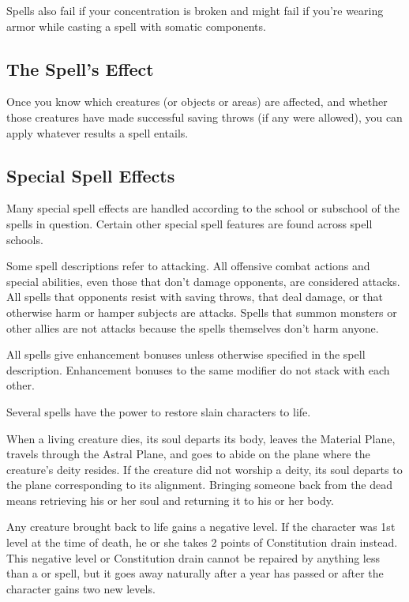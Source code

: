 Spells also fail if your concentration is broken and might fail if you're wearing armor while casting a spell with somatic components.

\subsection{The Spell's Effect}
Once you know which creatures (or objects or areas) are affected, and whether those creatures have made successful saving throws (if any were allowed), you can apply whatever results a spell entails.

\subsection{Special Spell Effects}
Many special spell effects are handled according to the school or subschool of the
spells in question. Certain other special spell features are found across spell schools.

 Some spell descriptions refer to attacking. All offensive combat actions and special abilities, even those that don't damage opponents, are considered attacks. All spells that opponents resist with saving throws, that deal damage, or that otherwise harm or hamper subjects are attacks. Spells that summon monsters or other allies are not attacks because the spells themselves don't harm anyone.

 All spells give enhancement bonuses unless otherwise specified in the spell description. Enhancement bonuses to the same modifier do not stack with each other.

\label{Bringing Back the Dead}
 Several spells have the power to restore slain characters to life.

When a living creature dies, its soul departs its body, leaves the Material Plane, travels through the Astral Plane, and goes to abide on the plane where the creature's deity resides. If the creature did not worship a deity, its soul departs to the plane corresponding to its alignment. Bringing someone back from the dead means retrieving his or her soul and returning it to his or her body.

 Any creature brought back to life gains a negative level. If the character was 1st level at the time of death, he or she takes 2 points of Constitution drain instead. This negative level or Constitution drain cannot be repaired by anything less than a  or  spell, but it goes away naturally after a year has passed or after the character gains two new levels.

